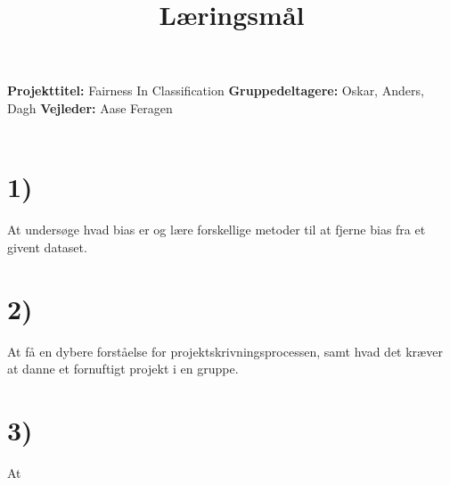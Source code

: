 \documentclass[11pt, fleqn]{article}
\title{Læringsmål}
\date{}
\begin{document}
	\maketitle
	\noindent
	\vspace*{-1.4cm}
	\noindent
	\textbf{Projekttitel:} Fairness In Classification \newline \noindent
	\textbf{Gruppedeltagere:} Oskar, Anders, Dagh \newline  \noindent
	\textbf{Vejleder:} Aase Feragen \noindent
	\\\\
	\section*{1)}
	At undersøge hvad bias er og lære forskellige metoder til at fjerne bias fra et givent dataset.
	\section*{2)}
	At få en dybere forståelse for projektskrivningsprocessen, samt hvad det kræver at danne et fornuftigt projekt i en gruppe.
	
	\section*{3)}
	At 
	
\end{document}
